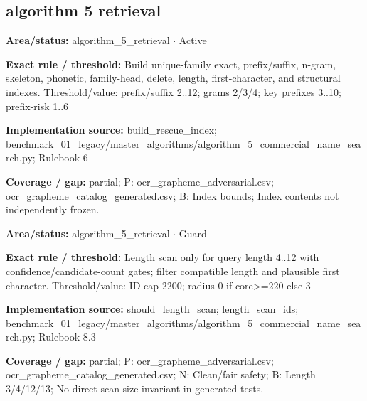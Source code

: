 \subsection*{algorithm 5 retrieval}
\begin{tcolorbox}[enhanced,breakable,colback=white,colframe=Muted!45,boxrule=0.45pt,arc=1.5pt,left=6pt,right=6pt,top=5pt,bottom=5pt,title={\texttt{A5-INDEX-FAMILY-01}},title after break={\texttt{A5-INDEX-FAMILY-01}\ (continued)},fonttitle=\headingfont\bfseries\color{Navy},coltitle=Navy]
\textbf{Area/status:} algorithm\_\allowbreak{}5\_\allowbreak{}retrieval $\boldsymbol{\cdot}$ Active\par
\smallskip
\textbf{Exact rule / threshold:} Build unique-family exact, prefix/\allowbreak{}suffix, n-gram, skeleton, phonetic, family-head, delete, length, first-character, and structural indexes. Threshold/\allowbreak{}value: prefix/\allowbreak{}suffix 2..12; grams 2/\allowbreak{}3/\allowbreak{}4; key prefixes 3..10; prefix-risk 1..6\par
\smallskip
\textbf{Implementation source:} build\_\allowbreak{}rescue\_\allowbreak{}index; benchmark\_\allowbreak{}01\_\allowbreak{}legacy/\allowbreak{}master\_\allowbreak{}algorithms/\allowbreak{}algorithm\_\allowbreak{}5\_\allowbreak{}commercial\_\allowbreak{}name\_\allowbreak{}search.py; Rulebook 6\par
\smallskip
\textbf{Coverage / gap:} partial; P: ocr\_\allowbreak{}grapheme\_\allowbreak{}adversarial.csv; ocr\_\allowbreak{}grapheme\_\allowbreak{}catalog\_\allowbreak{}generated.csv; B: Index bounds; Index contents not independently frozen.
\end{tcolorbox}
\begin{tcolorbox}[enhanced,breakable,colback=white,colframe=Muted!45,boxrule=0.45pt,arc=1.5pt,left=6pt,right=6pt,top=5pt,bottom=5pt,title={\texttt{A5-LENGTH-SCAN-04}},title after break={\texttt{A5-LENGTH-SCAN-04}\ (continued)},fonttitle=\headingfont\bfseries\color{Navy},coltitle=Navy]
\textbf{Area/status:} algorithm\_\allowbreak{}5\_\allowbreak{}retrieval $\boldsymbol{\cdot}$ Guard\par
\smallskip
\textbf{Exact rule / threshold:} Length scan only for query length 4..12 with confidence/\allowbreak{}candidate-count gates; filter compatible length and plausible first character. Threshold/\allowbreak{}value: ID cap 2200; radius 0 if core>=220 else 3\par
\smallskip
\textbf{Implementation source:} should\_\allowbreak{}length\_\allowbreak{}scan; length\_\allowbreak{}scan\_\allowbreak{}ids; benchmark\_\allowbreak{}01\_\allowbreak{}legacy/\allowbreak{}master\_\allowbreak{}algorithms/\allowbreak{}algorithm\_\allowbreak{}5\_\allowbreak{}commercial\_\allowbreak{}name\_\allowbreak{}search.py; Rulebook 8.3\par
\smallskip
\textbf{Coverage / gap:} partial; P: ocr\_\allowbreak{}grapheme\_\allowbreak{}adversarial.csv; ocr\_\allowbreak{}grapheme\_\allowbreak{}catalog\_\allowbreak{}generated.csv; N: Clean/\allowbreak{}fair safety; B: Length 3/\allowbreak{}4/\allowbreak{}12/\allowbreak{}13; No direct scan-size invariant in generated tests.
\end{tcolorbox}
\medskip
